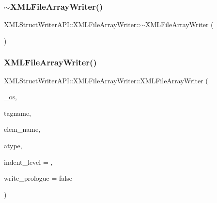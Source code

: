 \subsubsection{\texorpdfstring{$\sim$XMLFileArrayWriter()}{~XMLFileArrayWriter()}\hspace{0.1cm}{\footnotesize\ttfamily [2/3]}}
{\footnotesize\ttfamily X\+M\+L\+Struct\+Writer\+A\+P\+I\+::\+X\+M\+L\+File\+Array\+Writer\+::$\sim$\+X\+M\+L\+File\+Array\+Writer (\begin{DoxyParamCaption}\item[{void}]{ }\end{DoxyParamCaption})\hspace{0.3cm}{\ttfamily [inline]}}

\mbox{\label{classXMLStructWriterAPI_1_1XMLFileArrayWriter_ab4591c76da7c7db03abe6a3e4cf0529a}} 
\subsubsection{\texorpdfstring{XMLFileArrayWriter()}{XMLFileArrayWriter()}\hspace{0.1cm}{\footnotesize\ttfamily [3/3]}}
{\footnotesize\ttfamily X\+M\+L\+Struct\+Writer\+A\+P\+I\+::\+X\+M\+L\+File\+Array\+Writer\+::\+X\+M\+L\+File\+Array\+Writer (\begin{DoxyParamCaption}\item[{std\+::ofstream \&}]{\+\_\+os,  }\item[{const std\+::string \&}]{tagname,  }\item[{const std\+::string \&}]{elem\+\_\+name,  }\item[{\mbox{\hyperlink{namespaceXMLStructWriterAPI_a2017208be87c77a32bdc19ea2f14d032}{Array\+Type}}}]{atype,  }\item[{int}]{indent\+\_\+level = {},  }\item[{bool}]{write\+\_\+prologue = {\ttfamily false} }\end{DoxyParamCaption})\hspace{0.3cm}{\ttfamily [inline]}}


